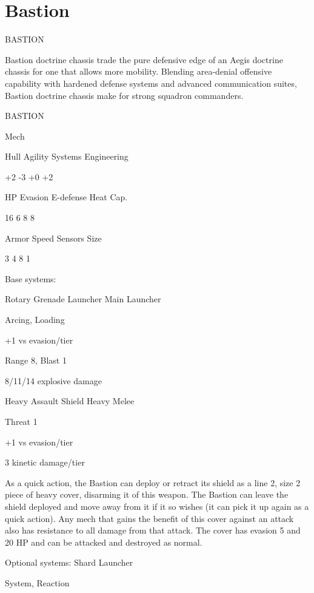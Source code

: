 \section{Bastion}

                                               BASTION  

Bastion doctrine chassis trade the pure defensive edge of an Aegis doctrine chassis for one that  
allows more mobility. Blending area-denial offensive capability with hardened defense systems  
and advanced communication suites, Bastion doctrine chassis make for strong squadron  
commanders.   

 BASTION 

 Mech 

 Hull       Agility     Systems       Engineering 

 +2         -3          +0            +2 

 HP         Evasion      E-defense    Heat Cap. 

 16         6           8             8 

 Armor      Speed       Sensors       Size 

 3          4           8             1 

Base systems:
 
Rotary Grenade Launcher  
Main Launcher
 
Arcing, Loading
 
+1 vs evasion/tier
 
Range 8, Blast 1
 
8/11/14 explosive damage
 

Heavy Assault Shield  
Heavy Melee
 
Threat 1
 
+1 vs evasion/tier
 
3 kinetic damage/tier
 
As a quick action, the Bastion can deploy or retract its shield as a line 2, size 2 piece of heavy  
cover, disarming it of this weapon. The Bastion can leave the shield deployed and move away  
from it if it so wishes (it can pick it up again as a quick action). Any mech that gains the benefit of  
this cover against an attack also has resistance to all damage from that attack. The cover has  
evasion 5 and 20 HP and can be attacked and destroyed as normal.
 

Optional systems:  
Shard Launcher
 
System, Reaction
 

                                                                                                         


